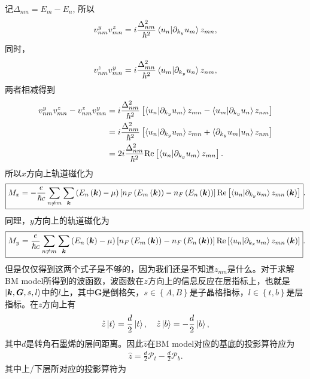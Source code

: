 \documentclass[10pt, oneside]{article}
\newcommand{\pa}{\partial}
\newcommand{\mr}[1]{\mathrm{#1}}
\newcommand{\p}[1]{\left(#1\right)}
\newcommand{\bb}[1]{\left[#1\right]}
\newcommand{\br}[1]{\left\{#1\right\}}
\begin{document}
记\(\Delta_{nm} = E_m - E_n\), 所以
\begin{align}
	v^{y}_{nm} v^{z}_{mn} = i \frac{\Delta^{2}_{nm}}{\hbar^2} \braket{u_n | \pa_{k_y} u_m} z_{mn},
\end{align}
同时，
\begin{align}
	v^{z}_{nm} v^{y}_{mn} =  i \frac{\Delta^{2}_{mn}}{\hbar^2} \braket{u_m | \pa_{k_y} u_n} z_{nm},
\end{align}
两者相减得到
\begin{align}
	\begin{split}
		v^{y}_{nm} v^{z}_{mn} - v^{z}_{nm} v^{y}_{mn} &= i \frac{\Delta^{2}_{nm}}{\hbar^2} \bb{ \braket{u_n | \pa_{k_y} u_m} z_{mn} - \braket{u_m | \pa_{k_y} u_n} z_{nm} } \\
		& = i \frac{\Delta^{2}_{nm}}{\hbar^2} \bb{ \braket{u_n | \pa_{k_y} u_m} z_{mn} + \braket{\pa_{k_y} u_m |  u_n} z_{nm} } \\
		& = 2 i \frac{\Delta^{2}_{nm}}{\hbar^2} \mr{Re} \bb{\braket{u_n | \pa_{k_y} u_m} z_{mn}  }.
	\end{split}
\end{align}
所以\(x\)方向上轨道磁化为
\begin{align}
		\boxed{
			M_x = -\frac{e}{\hbar c} \sum_{n \neq m} \sum_{\bm{k}} \p{E_n \p{\bm{k}} - \mu} \bb{n_{F} \p{E_m \p{\bm{k}}   } - n_{F} \p{E_n \p{\bm{k}} }} \mr{Re} \bb{\braket{u_n | \pa_{k_y} u_m} z_{mn} \p{\bm{k}}  }
		}.
\end{align}
同理，\(y\)方向上的轨道磁化为
\begin{align}
		\boxed{
			M_y = \frac{e}{\hbar c} \sum_{n \neq m} \sum_{\bm{k}}  \p{E_n \p{\bm{k}}  - \mu} \bb{n_{F} \p{E_m \p{\bm{k}} } - n_{F} \p{E_n \p{\bm{k}} }} \mr{Re} \bb{\braket{u_n | \pa_{k_x} u_m} z_{mn} \p{\bm{k}}  }
		}.
\end{align}
但是仅仅得到这两个式子是不够的，因为我们还是不知道\(z_{mn}\)是什么。对于求解BM model所得到的波函数，波函数在\(z\)方向上的信息反应在层指标上，也就是\(\ket{\bm{k}, \bm{G}, s, l}\)中的\(l\)上，其中\(\bm{G}\)是倒格矢，\(s \in \br{A,B}\)是子晶格指标，\(l \in \br{t, b}\)是层指标。在\(z\)方向上有
\begin{align}
	\hat{z} \ket{t} = \frac{d}{2} \ket{t}, \quad \hat{z} \ket{b} = - \frac{d}{2} \ket{b},
\end{align}
其中\(d\)是转角石墨烯的层间距离。因此\(\hat{z}\)在BM model对应的基底的投影算符应为
\begin{align}
	\hat{z} = \frac{d}{2} \mathcal{P}_{t} - \frac{d}{2} \mathcal{P}_{b}.
\end{align}
其中上/下层所对应的投影算符为
\end{document}
